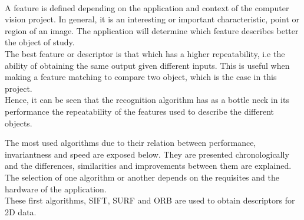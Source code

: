 \\
A feature is defined depending on the application and context of the computer vision project. In general, it is an interesting or important characteristic, point or region of an image. The application will determine which feature describes better the object of study. 
\\

The best feature or descriptor is that which has a higher repeatability, i.e the ability of obtaining the same output given different inputs. This is useful when making a feature matching to compare two object, which is the case in this project. 
\\

Hence, it can be seen that the recognition algorithm has as a bottle neck in its performance the repeatability of the features used to describe the different objects. 

The most used algorithms due to their relation between performance, invariantness and speed are exposed below. They are presented chronologically and the differences, similarities and improvements between them are explained. 
\\

The selection of one algorithm or another depends on the requisites and the hardware of the application.
\\

These first algorithms, SIFT, SURF and ORB are used to obtain descriptors for 2D data. 

		
		
		



